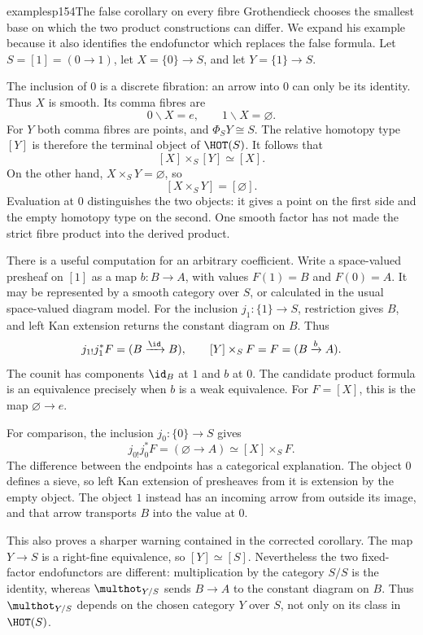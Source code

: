 \begin{dcomment}{examples}{p154}{The false corollary on every fibre}
Grothendieck chooses the smallest base on which the two product constructions can differ. We expand his example because it also identifies the endofunctor which replaces the false formula. Let $S=[1]=(0\longrightarrow1)$, let $X=\{0\}\longrightarrow S$, and let $Y=\{1\}\longrightarrow S$.

The inclusion of $0$ is a discrete fibration: an arrow into $0$ can only be its identity. Thus $X$ is smooth. Its comma fibres are
\[
 0\backslash X=e,\qquad1\backslash X=\varnothing.
\]
For $Y$ both comma fibres are points, and $\Phi_SY\cong S$. The relative homotopy type $[Y]$ is therefore the terminal object of $\HOT(S)$. It follows that
\[
 [X]\times_S[Y]\simeq[X].
\]
On the other hand, $X\times_SY=\varnothing$, so
\[
 [X\times_SY]=[\varnothing].
\]
Evaluation at $0$ distinguishes the two objects: it gives a point on the first side and the empty homotopy type on the second. One smooth factor has not made the strict fibre product into the derived product.

There is a useful computation for an arbitrary coefficient. Write a space-valued presheaf on $[1]$ as a map $b:B\longrightarrow A$, with values $F(1)=B$ and $F(0)=A$. It may be represented by a smooth category over $S$, or calculated in the usual space-valued diagram model. For the inclusion $j_1:\{1\}\longrightarrow S$, restriction gives $B$, and left Kan extension returns the constant diagram on $B$. Thus
\[
 j_{1!}j_1^*F=(B\xrightarrow{\id}B),
 \qquad [Y]\times_SF=F=(B\xrightarrow{b}A).
\]
The counit has components $\id_B$ at $1$ and $b$ at $0$. The candidate product formula is an equivalence precisely when $b$ is a weak equivalence. For $F=[X]$, this is the map $\varnothing\longrightarrow e$.

For comparison, the inclusion $j_0:\{0\}\longrightarrow S$ gives
\[
 j_{0!}j_0^*F=(\varnothing\longrightarrow A)
 \simeq[X]\times_SF.
\]
The difference between the endpoints has a categorical explanation. The object $0$ defines a sieve, so left Kan extension of presheaves from it is extension by the empty object. The object $1$ instead has an incoming arrow from outside its image, and that arrow transports $B$ into the value at $0$.

This also proves a sharper warning contained in the corrected corollary. The map $Y\longrightarrow S$ is a right-fine equivalence, so $[Y]\simeq[S]$. Nevertheless the two fixed-factor endofunctors are different: multiplication by the category $S/S$ is the identity, whereas $\multhot_{Y/S}$ sends $B\longrightarrow A$ to the constant diagram on $B$. Thus $\multhot_{Y/S}$ depends on the chosen category $Y$ over $S$, not only on its class in $\HOT(S)$.
\end{dcomment}

